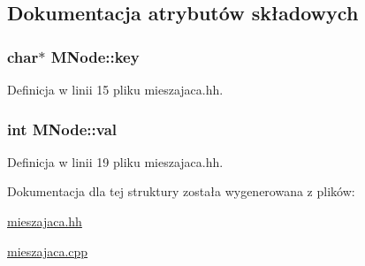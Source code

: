 \subsection{Dokumentacja atrybutów składowych}
\hypertarget{struct_m_node_a34eaceeae213bc93c9f18b752801a1f0}{
\subsubsection[{key}]{\setlength{\rightskip}{0pt plus 5cm}char$\ast$ M\-Node\-::key}}\label{struct_m_node_a34eaceeae213bc93c9f18b752801a1f0}


Definicja w linii 15 pliku mieszajaca.\-hh.

\hypertarget{struct_m_node_a9ba04f597c758c10b9f2309322fe4c8d}{
\subsubsection[{val}]{\setlength{\rightskip}{0pt plus 5cm}int M\-Node\-::val}}\label{struct_m_node_a9ba04f597c758c10b9f2309322fe4c8d}


Definicja w linii 19 pliku mieszajaca.\-hh.



Dokumentacja dla tej struktury została wygenerowana z plików\-:\begin{DoxyCompactItemize}
\item 
\hyperlink{mieszajaca_8hh}{mieszajaca.\-hh}\item 
\hyperlink{mieszajaca_8cpp}{mieszajaca.\-cpp}\end{DoxyCompactItemize}

